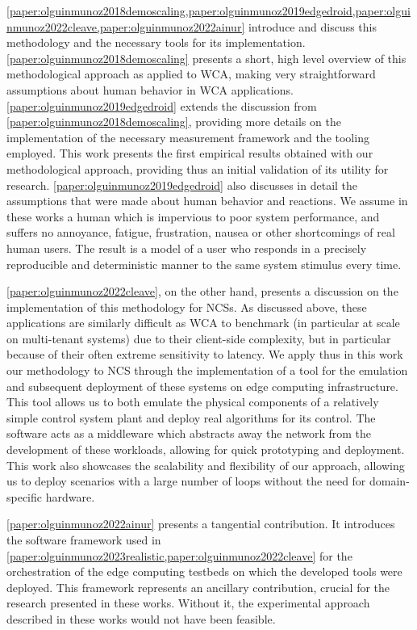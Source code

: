 \cref{paper:olguinmunoz2018demoscaling,paper:olguinmunoz2019edgedroid,paper:olguinmunoz2022cleave,paper:olguinmunoz2022ainur} introduce and discuss this methodology and the necessary tools for its implementation.
\cref{paper:olguinmunoz2018demoscaling} presents a short, high level overview of this methodological approach as applied to \ac{WCA}, making very straightforward assumptions about human behavior in \ac{WCA} applications.
\cref{paper:olguinmunoz2019edgedroid} extends the discussion from \cref{paper:olguinmunoz2018demoscaling}, providing more details on the implementation of the necessary measurement framework and the tooling employed.
This work presents the first empirical results obtained with our methodological approach, providing thus an initial validation of its utility for research.
\cref{paper:olguinmunoz2019edgedroid} also discusses in detail the assumptions that were made about human behavior and reactions.
We assume in these works a human which is impervious to poor system performance, and suffers no annoyance, fatigue, frustration, nausea or other shortcomings of real human users.
The result is a model of a user who responds in a precisely reproducible and deterministic manner to the same system stimulus every time.

\cref{paper:olguinmunoz2022cleave}, on the other hand, presents a discussion on the implementation of this methodology for \acp{NCS}.
As discussed above, these applications are similarly difficult as \ac{WCA} to benchmark (in particular at scale on multi-tenant systems) due to their client-side complexity, but in particular because of their often extreme sensitivity to latency.
We apply thus in this work our methodology to \ac{NCS} through the implementation of a tool for the emulation and subsequent deployment of these systems on edge computing infrastructure.
This tool allows us to both emulate the physical components of a relatively simple control system plant and deploy real algorithms for its control.
The software acts as a middleware which abstracts away the network from the development of these workloads, allowing for quick prototyping and deployment.
This work also showcases the scalability and flexibility of our approach, allowing us to deploy scenarios with a large number of loops without the need for domain-specific hardware.

\cref{paper:olguinmunoz2022ainur} presents a tangential contribution.
It introduces the software framework used in \cref{paper:olguinmunoz2023realistic,paper:olguinmunoz2022cleave} for the orchestration of the edge computing testbeds on which the developed tools were deployed.
This framework represents an ancillary contribution, crucial for the research presented in these works.
Without it, the experimental approach described in these works would not have been feasible.

